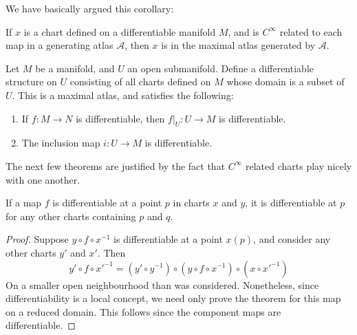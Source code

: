 We have basically argued this corollary:

\begin{corollary}
    If $x$ is a chart defined on a differentiable manifold $M$, and is $C^\infty$ related to each map in a generating atlas $\mathcal{A}$, then $x$ is in the maximal atlas generated by $\mathcal{A}$.
\end{corollary}

\begin{example}
    Let $M$ be a manifold, and $U$ an open submanifold. Define a differentiable structure on $U$ consisting of all charts defined on $M$ whose domain is a subset of $U$. This is a maximal atlas, and satisfies the following:
    \begin{enumerate}
        \item If $f: M \to N$ is differentiable, then $f|_U: U \to M$ is differentiable.
        \item The inclusion map $i:U \to M$ is differentiable.
    \end{enumerate}
\end{example}

The next few theorems are justified by the fact that $C^\infty$ related charts play nicely with one another.

\begin{lemma}
    If a map $f$ is differentiable at a point $p$ in charts $x$ and $y$, it is differentiable at $p$ for any other charts containing $p$ and $q$.
\end{lemma}
\begin{proof}
    Suppose $y \circ f \circ x^{-1}$ is differentiable at a point $x(p)$, and consider any other charts $y'$ and $x'$. Then
    \[ y' \circ f \circ x'^{-1} = (y' \circ y^{-1}) \circ (y \circ f \circ x^{-1}) \circ (x \circ x'^{-1}) \]
    On a smaller open neighbourhood than was considered. Nonetheless, since differentiability is a local concept, we need only prove the theorem for this map on a reduced domain. This follows since the component maps are differentiable.
\end{proof}

